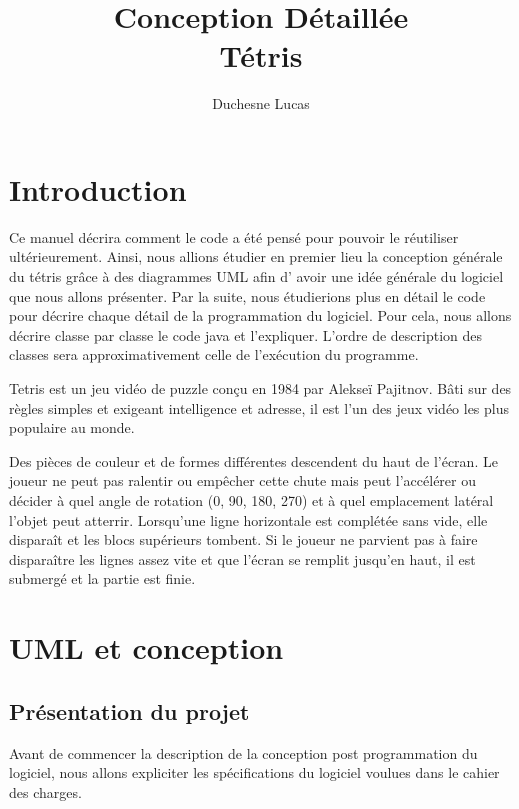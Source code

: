 \documentclass{article}           %
\title{Conception Détaillée\\
Tétris}     %
\author{Duchesne Lucas}        %
\begin{document}

\maketitle                        %
\newpage
\tableofcontents                  %
\newpage
\section{Introduction}            %

Ce manuel décrira comment le code a été pensé pour pouvoir le réutiliser ultérieurement. Ainsi, nous allions étudier en premier lieu la conception générale du tétris grâce à des diagrammes UML afin d' avoir une idée générale du logiciel que nous allons présenter.
Par la suite, nous étudierions plus en détail le code pour décrire chaque détail de la programmation du logiciel. Pour cela, nous allons décrire classe par classe le code java et l’expliquer. 
L'ordre de description des classes sera approximativement celle de l'exécution du programme.

Tetris est un jeu vidéo de puzzle conçu en 1984 par Alekseï Pajitnov. Bâti sur des règles simples et exigeant intelligence et adresse, il est l'un des jeux vidéo les plus populaire au monde.

Des pièces de couleur et de formes différentes descendent du haut de l'écran. Le joueur ne peut pas ralentir ou empêcher cette chute mais peut l'accélérer ou décider à quel angle de rotation (0, 90, 180, 270) et à quel emplacement latéral l'objet peut atterrir. Lorsqu'une ligne horizontale est complétée sans vide, elle disparaît et les blocs supérieurs tombent. Si le joueur ne parvient pas à faire disparaître les lignes assez vite et que l'écran se remplit jusqu'en haut, il est submergé et la partie est finie.

\section{UML et conception}

\subsection{Présentation du projet}
Avant de commencer la description de la conception post programmation du logiciel, nous allons expliciter les spécifications du logiciel voulues dans le cahier des charges.
\end{document}

